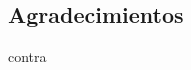 \documentclass[11pt, oneside]{book}
\author{José Luis Garrido Castro}
\begin{document}
 
\frontmatter

\portada

\begin{dedicatoria}
    \chapter*{Agradecimientos}

\end{dedicatoria}





\mainmatter
\marcagua







\clearpage
\backmatter
 {contra}
\end{document}
